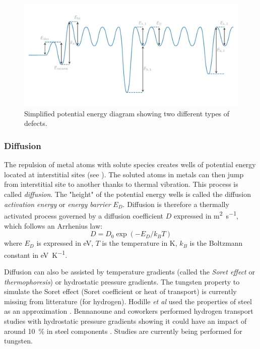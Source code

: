 \begin{figure} [h]
    \centering
    \includegraphics[width=\linewidth]{Figures/Chapter1/potential_energy_diagram.pdf}
    \caption{Simplified potential energy diagram showing two different types of defects.}
\end{figure}

\subsubsection{Diffusion}
The repulsion of metal atoms with solute species creates wells of potential energy located at interstitial sites (see ).
The soluted atoms in metals can then jump from interstitial site to another thanks to thermal vibration.
This process is called \textit{diffusion}.
The "height" of the potential energy wells is called the diffusion \textit{activation energy} or \textit{energy barrier} $E_D$.
Diffusion is therefore a thermally activated process governed by a diffusion coefficient $D$ expressed in \si{m^2.s^{-1}}, which follows an Arrhenius law:
\begin{equation}
    D = D_0 \exp{(-E_D/k_B T)}
\end{equation}
where $E_D$ is expressed in \si{eV}, $T$ is the temperature in \si{K}, $k_B$ is the Boltzmann constant in \si{eV.K^{-1}}.

Diffusion can also be assisted by temperature gradients (called the \textit{Soret effect} or \textit{thermophoresis})  or hydrostatic pressure gradients.
The tungsten property to simulate the Soret effect (Soret coefficient or heat of transport) is currently missing from litterature (for hydrogen).
Hodille \textit{et al} used the properties of steel as an approximation \cite{hodille_estimation_2017}.
Bennanoune and coworkers performed hydrogen transport studies with hydrostatic pressure gradients showing it could have an impact of around \SI{10}{\%} in steel components .
Studies are currently being performed for tungsten.

